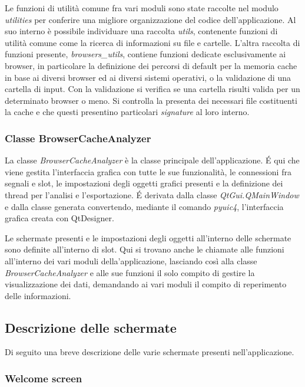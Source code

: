 Le funzioni di utilità comune fra vari moduli sono state raccolte nel modulo \textit{utilities} per conferire una migliore organizzazione del codice dell'applicazione. 
Al suo interno è possibile individuare una raccolta \textit{utils}, contenente funzioni di utilità comune come la ricerca di informazioni su file e cartelle. 
L'altra raccolta di funzioni presente, \textit{browsers\_utils}, contiene funzioni dedicate esclusivamente ai browser, in particolare la definizione dei percorsi di default per la memoria cache in base ai diversi browser ed ai diversi sistemi operativi, o la validazione di una cartella di input. Con la validazione si verifica se una cartella risulti valida per un determinato browser o meno. Si controlla la presenta dei necessari file costituenti la cache e che questi presentino particolari \textit{signature} al loro interno.

\clearpage

\subsubsection{Classe BrowserCacheAnalyzer}

La classe \textit{BrowserCacheAnalyzer} è la classe principale dell'applicazione. \'E qui che viene gestita l'interfaccia grafica con tutte le sue funzionalità, le connessioni fra segnali e slot, le impostazioni degli oggetti grafici presenti e la definizione dei thread per l'analisi e l'esportazione. \'E derivata dalla classe \textit{QtGui.QMainWindow} e dalla classe generata convertendo, mediante il comando \textit{pyuic4}, l'interfaccia grafica creata con QtDesigner.

Le schermate presenti e le impostazioni degli oggetti all'interno delle schermate sono definite all'interno di slot. Qui si trovano anche le chiamate alle funzioni all'interno dei vari moduli della'applicazione, lasciando così alla classe \textit{BrowserCacheAnalyzer} e alle sue funzioni il solo compito di gestire la visualizzazione dei dati, demandando ai vari moduli il compito di reperimento delle informazioni.

\clearpage

\subsection{Descrizione delle schermate}


Di seguito una breve descrizione delle varie schermate presenti nell'applicazione.

\subsubsection{Welcome screen}

